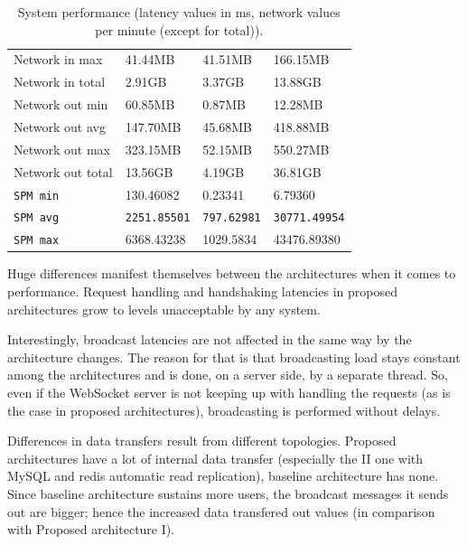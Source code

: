 \documentclass{uvamscse}
\begin{document}
\begin{table}[H]
\begin{center}
\begin{tabular}{llll}
  Network in max                & 41.44MB             & 41.51MB              & 166.15MB             \\
  Network in total              & 2.91GB              & 3.37GB               & 13.88GB             \\
  \hline
  Network out min               & 60.85MB             & 0.87MB               & 12.28MB             \\
  Network out avg               & 147.70MB            & 45.68MB              & 418.88MB             \\
  Network out max               & 323.15MB            & 52.15MB              & 550.27MB             \\
  Network out total             & 13.56GB             & 4.19GB               & 36.81GB             \\
  \hline
  \texttt{SPM min}              & 130.46082           & 0.23341              & 6.79360         \\
  \texttt{SPM avg}              & \texttt{2251.85501} & \texttt{797.62981}     & \texttt{30771.49954}         \\
  \texttt{SPM max}              & 6368.43238          & 1029.5834            & 43476.89380         \\
\end{tabular}
\end{center}
\caption{System performance (latency values in ms, network values per minute (except for total)).}
\label{table:spm}
\end{table}

Huge differences manifest themselves between the architectures when it comes to performance. Request handling and handshaking latencies in proposed architectures grow to levels unacceptable by any system.

Interestingly, broadcast latencies are not affected in the same way by the architecture changes. The reason for that is that broadcasting load stays constant among the architectures and is done, on a server side, by a separate thread. So, even if the WebSocket server is not keeping up with handling the requests (as is the case in proposed architectures), broadcasting is performed without delays.

Differences in data transfers result from different topologies. Proposed architectures have a lot of internal data transfer (especially the II one with MySQL and redis automatic read replication), baseline architecture has none. Since baseline architecture sustains more users, the broadcast messages it sends out are bigger; hence the increased data transfered out values (in comparison with Proposed architecture I).
\end{document}
